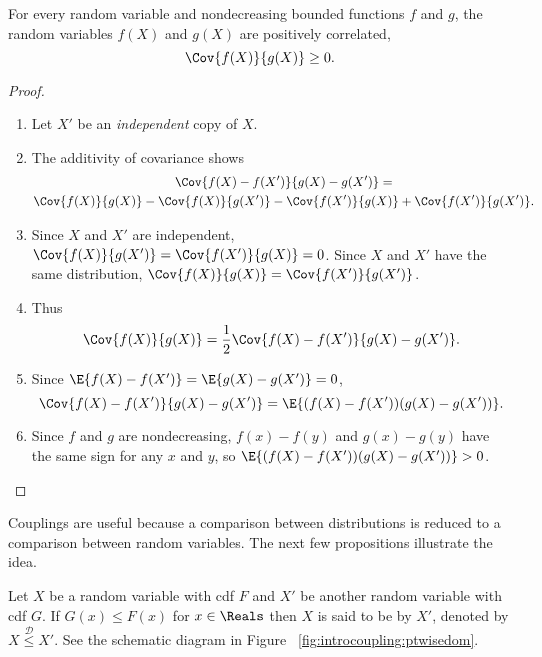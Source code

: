\documentclass[12pt]{article}
\begin{document}
\begin{proposition}
    For every random variable and nondecreasing bounded functions \( f \)
    and \( g \), the random variables \( f(X) \) and \( g(X) \) are
    positively correlated,
    \[
        \Cov{f(X)}{g(X)} \ge 0.
    \]
\end{proposition}

\begin{proof}
    \begin{enumerate}
        \item
            Let \( X' \) be an \emph{independent} copy of \( X \).
        \item
            The additivity of covariance shows
            \begin{multline*}
                \Cov{f(X)- f(X')}{g(X)-g(X')} = \\
                \Cov{f(X)}{g(X)} - \Cov{f(X)}{g(X')} - \Cov{f(X')}{g(X)}
                + \Cov{f(X')}{g(X')}.
            \end{multline*}
        \item
            Since \( X \) and \( X' \) are independent, \( \Cov{f(X)}{g(X')}
            = \Cov{f(X')}{g(X)} = 0 \).  Since \( X \) and \( X' \) have
            the same distribution, \( \Cov{f(X)}{g(X)} = \Cov{f(X')}{g(X')}
            \).
        \item
            Thus
            \[
                \Cov{f(X)}{g(X)} = \frac{1}{2} \Cov{f(X)- f(X')}{g(X)-g(X')}.
            \]
        \item
            Since \( \E{f(X)- f(X')} = \E{g(X)-g(X')} = 0 \),
            \[
                \Cov{f(X)- f(X')}{g(X)-g(X')} = \E{(f(X)- f(X'))(g(X)-g(X'))}.
            \]
        \item
            Since \( f \) and \( g \) are nondecreasing, \( f(x) - f(y) \)
            and \( g(x) - g(y) \) have the same sign for any \( x \) and
            \( y \), so \( \E{(f(X)- f(X'))(g(X)-g(X'))} > 0 \).
    \end{enumerate}
\end{proof}

\begin{remark}
    Couplings are useful because a comparison between distributions is
    reduced to a comparison between random variables.  The next few
    propositions illustrate the idea.
\end{remark}

\begin{definition}
    Let \( X \) be a random variable with cdf \( F \) and \( X' \) be
    another random variable with cdf \( G \).  If \( G(x) \le F(x) \)
    for \( x \in \Reals \) then \( X \) is said to be  by \( X' \), denoted by \( X \stackrel{\mathcal{D}}{\le}
    X' \).  See the schematic diagram in Figure~%
    \ref{fig:introcoupling:ptwisedom}.
\end{definition}
\end{document}
